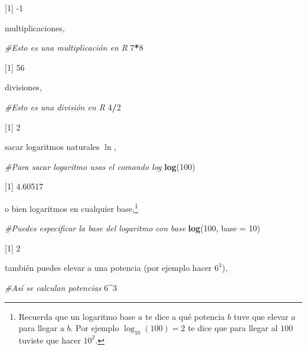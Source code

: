 \documentclass[
]{book}
\newenvironment{Shaded}{\begin{snugshade}}{\end{snugshade}}
\newcommand{\CommentTok}[1]{\textcolor[rgb]{0.56,0.35,0.01}{\textit{#1}}}
\newcommand{\DataTypeTok}[1]{\textcolor[rgb]{0.13,0.29,0.53}{#1}}
\newcommand{\DecValTok}[1]{\textcolor[rgb]{0.00,0.00,0.81}{#1}}
\newcommand{\KeywordTok}[1]{\textcolor[rgb]{0.13,0.29,0.53}{\textbf{#1}}}
\newcommand{\NormalTok}[1]{#1}
\newcommand{\OperatorTok}[1]{\textcolor[rgb]{0.81,0.36,0.00}{\textbf{#1}}}
\begin{document}
{[}1{]} -1

multiplicaciones,

\begin{Shaded}
\begin{Highlighting}[]
\CommentTok{#Esto es una multiplicación en R}
\DecValTok{7}\OperatorTok{*}\DecValTok{8}
\end{Highlighting}
\end{Shaded}

{[}1{]} 56

divisiones,

\begin{Shaded}
\begin{Highlighting}[]
\CommentTok{#Esto es una división en R}
\DecValTok{4}\OperatorTok{/}\DecValTok{2}
\end{Highlighting}
\end{Shaded}

{[}1{]} 2

sacar logaritmos naturales \(\ln\),

\begin{Shaded}
\begin{Highlighting}[]
\CommentTok{#Para sacar logaritmo usas el comando log}
\KeywordTok{log}\NormalTok{(}\DecValTok{100}\NormalTok{)}
\end{Highlighting}
\end{Shaded}

{[}1{]} 4.60517

o bien logaritmos en cualquier base,\footnote{Recuerda que un logaritmo base \(a\) te dice a qué potencia \(b\) tuve que elevar \(a\) para llegar a \(b\). Por ejemplo \(\log_{10}(100) = 2\) te dice que para llegar al \(100\) tuviste que hacer \(10^2\).}

\begin{Shaded}
\begin{Highlighting}[]
\CommentTok{#Puedes especificar la base del logaritmo con base }
\KeywordTok{log}\NormalTok{(}\DecValTok{100}\NormalTok{, }\DataTypeTok{base =} \DecValTok{10}\NormalTok{)}
\end{Highlighting}
\end{Shaded}

{[}1{]} 2

también puedes elevar a una potencia (por ejemplo hacer \(6^3\)),

\begin{Shaded}
\begin{Highlighting}[]
\CommentTok{#Así se calculan potencias}
\DecValTok{6}\OperatorTok{^}\DecValTok{3}
\end{Highlighting}
\end{Shaded}
\end{document}
